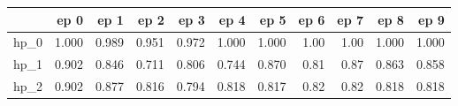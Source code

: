 \begin{tabular}{lrrrrrrrrrr}
\toprule
{} &   ep 0 &   ep 1 &   ep 2 &   ep 3 &   ep 4 &   ep 5 &  ep 6 &  ep 7 &   ep 8 &   ep 9 \\
\midrule
hp\_0 &  1.000 &  0.989 &  0.951 &  0.972 &  1.000 &  1.000 &  1.00 &  1.00 &  1.000 &  1.000 \\
hp\_1 &  0.902 &  0.846 &  0.711 &  0.806 &  0.744 &  0.870 &  0.81 &  0.87 &  0.863 &  0.858 \\
hp\_2 &  0.902 &  0.877 &  0.816 &  0.794 &  0.818 &  0.817 &  0.82 &  0.82 &  0.818 &  0.818 \\
\bottomrule
\end{tabular}
